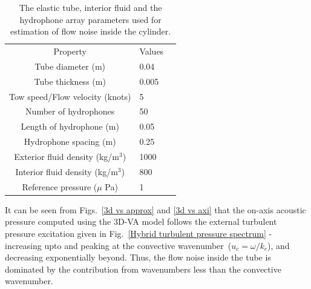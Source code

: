 \documentclass[twocolumn,10pt]{asme2ej}
\begin{document}
\begin{table}[t]
\caption{The elastic tube, interior fluid and the hydrophone array parameters used for estimation of flow noise inside the cylinder.}
\begin{center}
\label{tab:PresentVsJineesh}
\begin{tabular}{c l l}
& & \\ %
 \hline
 Property & Values\\
 \hline
 Tube diameter (m)  & 0.04 \\
 \hline
 Tube thickness (m) & 0.005 \\
 \hline
 Tow speed/Flow velocity (knots) & 5 \\
 \hline
 Number of hydrophones & 50 \\
 \hline
 Length of hydrophone (m) & 0.05 \\
 \hline
 Hydrophone spacing (m) & 0.25 \\
 \hline
 Exterior fluid density (kg/m$^{3}$) & 1000 \\
 \hline
 Interior fluid density (kg/m$^{3}$) & 800 \\
 \hline
 Reference pressure ($\mu$ Pa) & 1  \\ [0.5ex]
\hline
\end{tabular}
\end{center}
\end{table}
It can be seen from Figs.~\ref{3d vs approx} and \ref{3d vs axi} that the on-axis acoustic pressure computed using the 3D-VA model follows the external turbulent pressure excitation given in Fig.~\ref{Hybrid turbulent pressure spectrum} - increasing upto and peaking at the convective wavenumber~($u_c = \omega/k_c$), and decreasing exponentially beyond. Thus, the flow noise inside the tube is dominated by the contribution from wavenumbers less than the convective wavenumber.
\end{document}
